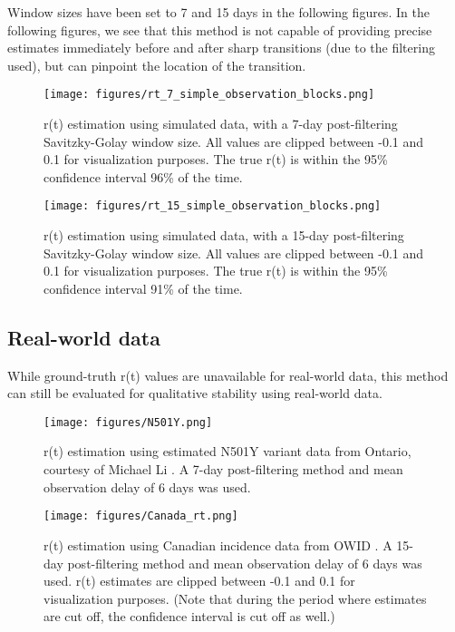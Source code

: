 \documentclass{article}
\begin{document}
Window sizes have been set to 7 and 15 days in the following figures. In the following figures, we see that this method is not capable of providing precise estimates immediately before and after sharp transitions (due to the filtering used), but can pinpoint the location of the transition.


\begin{figure}[h!]
\centering
\texttt{[image: figures/rt\_7\_simple\_observation\_blocks.png]}
\caption{r(t) estimation using simulated data, with a 7-day post-filtering Savitzky-Golay window size. All values are clipped between -0.1 and 0.1 for visualization purposes. The true r(t) is within the 95\% confidence interval 96\% of the time.}
\end{figure}

\clearpage
\begin{figure}[h!]
\centering
\texttt{[image: figures/rt\_15\_simple\_observation\_blocks.png]}
\caption{r(t) estimation using simulated data, with a 15-day post-filtering Savitzky-Golay window size. All values are clipped between -0.1 and 0.1 for visualization purposes. The true r(t) is within the 95\% confidence interval 91\% of the time.}
\end{figure}




\subsection{Real-world data}
While ground-truth r(t) values are unavailable for real-world data, this method can still be evaluated for qualitative stability using real-world data. 

\clearpage

\begin{figure}[h!]
\centering
\texttt{[image: figures/N501Y.png]}
\caption{r(t) estimation using estimated N501Y variant data from Ontario, courtesy of Michael Li \cite{mli}. A 7-day post-filtering method and mean observation delay of 6 days was used.}

\end{figure}

\clearpage
\begin{figure}[h!]
\centering
\texttt{[image: figures/Canada\_rt.png]}
\caption{r(t) estimation using Canadian incidence data from OWID \cite{OWID}. A 15-day post-filtering method and mean observation delay of 6 days was used. r(t) estimates are clipped between -0.1 and 0.1 for visualization purposes. (Note that during the period where estimates are cut off, the confidence interval is cut off as well.)}
\end{figure}
\end{document}
